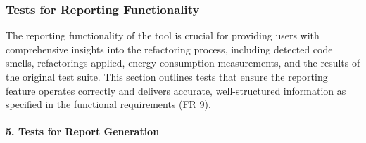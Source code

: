\documentclass[12pt, titlepage]{article}
\begin{document}
\subsubsection{Tests for Reporting Functionality}

The reporting functionality of the tool is crucial for providing users with comprehensive insights into the refactoring process, including detected code smells, refactorings applied, energy consumption measurements, and the results of the original test suite. This section outlines tests that ensure the reporting feature operates correctly and delivers accurate, well-structured information as specified in the functional requirements (FR 9). 
		
\paragraph{5. Tests for Report Generation\\}
\end{document}
